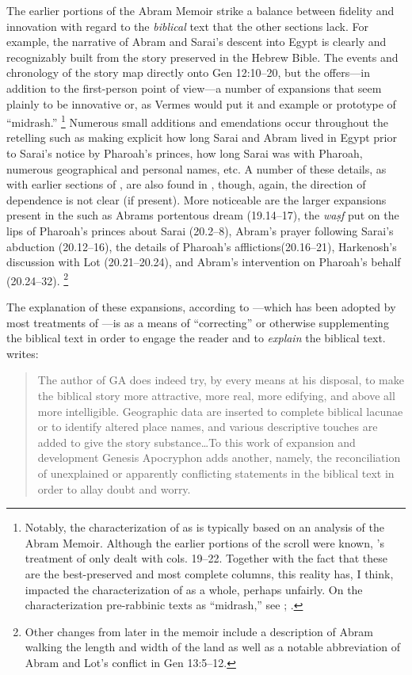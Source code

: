 The earlier portions of the Abram Memoir strike a balance between fidelity and innovation with regard to the \emph{biblical} text that the other sections lack. For example, the narrative of Abram and Sarai's descent into Egypt is clearly and recognizably built from the story preserved in the Hebrew Bible. The events and chronology of the story map directly onto Gen 12:10--20, but the \ga offers---in addition to the first-person point of view---a number of expansions that seem plainly to be innovative or, as Vermes would put it and example or prototype of ``midrash.''%
%
\footnote{\cite[124]{vermes1961} Notably, the characterization of \ga as \rwb is typically based on an analysis of the Abram Memoir. Although the earlier portions of the scroll were known, \vermes's treatment of \ga only dealt with cols. 19--22. Together with the fact that these are the best-preserved and most complete columns, this reality has, I think, impacted the characterization of \ga as a whole, perhaps unfairly. On the characterization pre-rabbinic texts as ``midrash,'' see \cite[GET PAGE RANGE]{mandel2017}; \cite{mandel_bakhos2006}.}
% 
Numerous small additions and emendations occur throughout the retelling such as making explicit how long Sarai and Abram lived in Egypt prior to Sarai's notice by Pharoah's princes, how long Sarai was with Pharoah, numerous geographical and personal names, etc. A number of these details, as with earlier sections of \ga, are also found in \jub, though, again, the direction of dependence is not clear (if present). More noticeable are the larger expansions present in the \ga such as Abrams portentous dream (19.14--17), the \emph{waṣf} put on the lips of Pharoah's princes about Sarai (20.2--8), Abram's prayer following Sarai's abduction (20.12--16), the details of Pharoah's afflictions(20.16--21), Harkenosh's discussion with Lot (20.21--20.24), and Abram's intervention on Pharoah's behalf (20.24--32).%
%
\footnote{Other changes from later in the memoir include a description of Abram walking the length and width of the land as well as a notable abbreviation of Abram and Lot's conflict in Gen 13:5--12.}

The explanation of these expansions, according to \vermes---which has been adopted by most treatments of \ga---is as a means of ``correcting'' or otherwise supplementing the biblical text in order to engage the reader and to \emph{explain} the biblical text.\autocite[126]{vermes1961} \vermes writes:

\begin{quote}
The author of GA does indeed try, by every means at his disposal, to make the biblical story more attractive, more real, more edifying, and above all more intelligible. Geographic data are inserted to complete biblical lacunae or to identify altered  place names, and various descriptive touches are added to give the story substance\dots To this work of expansion and development Genesis Apocryphon adds another, namely, the reconciliation of unexplained or apparently conflicting statements in the biblical text in order to allay doubt and worry.\autocite[125]{vermes1961}
\end{quote}

